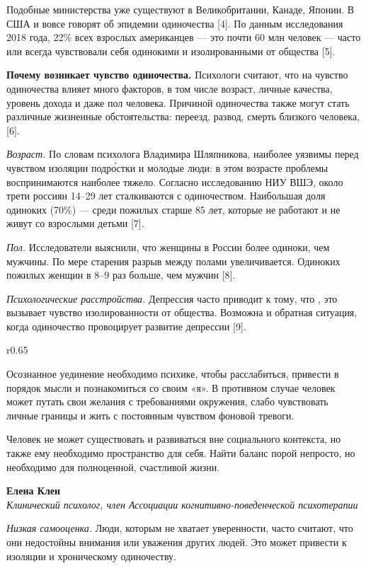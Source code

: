 Подобные министерства уже существуют в Великобритании, Канаде, Японии.
В США и вовсе говорят об эпидемии одиночества [4].
По данным исследования 2018 года, 22\% всех взрослых американцев
--- это почти 60 млн человек --- часто или всегда чувствовали себя
одинокими и изолированными от общества [5].


\textbf{Почему возникает чувство одиночества.}
Психологи считают, что на чувство одиночества влияет много факторов,
в том числе возраст, личные качества, уровень дохода и даже пол человека.
Причиной одиночества также могут стать различные жизненные обстоятельства:
переезд, развод, смерть близкого человека,
 [6].

\textit{Возраст.}
По словам психолога Владимира Шляпникова, наиболее уязвимы перед чувством
изоляции подр\'{о}стки и молодые люди:
в этом возрасте проблемы воспринимаются наиболее тяжело.
Согласно исследованию НИУ ВШЭ, около трети россиян 14–29 лет
сталкиваются с одиночеством.
Наибольшая доля одиноких (70\%) --- среди пожилых старше 85 лет,
которые не работают и не живут со взрослыми детьми [7].

\textit{Пол.}
Исследователи выяснили, что женщины в России более одиноки,
чем мужчины. По мере старения разрыв между полами увеличивается.
Одиноких пожилых женщин в 8–9 раз больше, чем мужчин [8].

\textit{Психологические расстройства.}
Депрессия часто приводит к тому, что
,
это вызывает чувство изолированности от общества.
Возможна и обратная ситуация, когда одиночество провоцирует
развитие депрессии [9].

\begin{wrapfigure}{r}{0.65\textwidth}
    \begin{fancyquotes}
        Осознанное уединение необходимо психике, чтобы расслабиться,
        привести в порядок мысли и познакомиться со своим «я».
        В противном случае человек может путать свои желания с требованиями окружения,
        слабо чувствовать личные границы и жить с постоянным чувством
        фоновой тревоги.

        Человек не может существовать и развиваться вне социального контекста,
        но также ему необходимо пространство для себя.
        Найти баланс порой непросто, но необходимо для полноценной, счастливой жизни.

        \begin{flushright}
            \textbf{Елена Клен}\\
            \textit{Клинический психолог,
                член Ассоциации когнитивно-поведенческой психотерапии}
        \end{flushright}
    \end{fancyquotes}
\end{wrapfigure}
\textit{Низкая самооценка.}
Люди, которым не хватает уверенности, часто считают, что они
недостойны внимания или уважения других людей.
Это может привести к изоляции и хроническому одиночеству.

